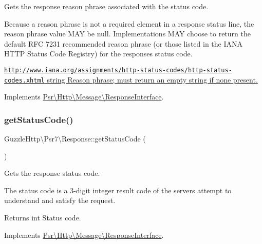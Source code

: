 Gets the response reason phrase associated with the status code.

Because a reason phrase is not a required element in a response status line, the reason phrase value M\+AY be null. Implementations M\+AY choose to return the default R\+FC 7231 recommended reason phrase (or those listed in the I\+A\+NA H\+T\+TP Status Code Registry) for the response\textquotesingle{}s status code.

\hyperlink{}{\href{http://www.iana.org/assignments/http-status-codes/http-status-codes.xhtml}{\tt http\+://www.\+iana.\+org/assignments/http-\/status-\/codes/http-\/status-\/codes.\+xhtml}  string Reason phrase; must return an empty string if none present. }

Implements \hyperlink{interfacePsr_1_1Http_1_1Message_1_1ResponseInterface_a98ae6592ab231946a767d9b422142a26}{Psr\textbackslash{}\+Http\textbackslash{}\+Message\textbackslash{}\+Response\+Interface}.

\mbox{\label{classGuzzleHttp_1_1Psr7_1_1Response_af62648e0dfc88b9100d82c188337882a}} 
\subsubsection{\texorpdfstring{get\+Status\+Code()}{getStatusCode()}}
{\footnotesize\ttfamily Guzzle\+Http\textbackslash{}\+Psr7\textbackslash{}\+Response\+::get\+Status\+Code (\begin{DoxyParamCaption}{ }\end{DoxyParamCaption})}

Gets the response status code.

The status code is a 3-\/digit integer result code of the server\textquotesingle{}s attempt to understand and satisfy the request.

\begin{DoxyReturn}{Returns}
int Status code. 
\end{DoxyReturn}


Implements \hyperlink{interfacePsr_1_1Http_1_1Message_1_1ResponseInterface_a599198ec3cc30dc374da26e504c65868}{Psr\textbackslash{}\+Http\textbackslash{}\+Message\textbackslash{}\+Response\+Interface}.

\mbox{\label{classGuzzleHttp_1_1Psr7_1_1Response_ac436d34fd685d7a4ddfe5931ecd58538}} 
